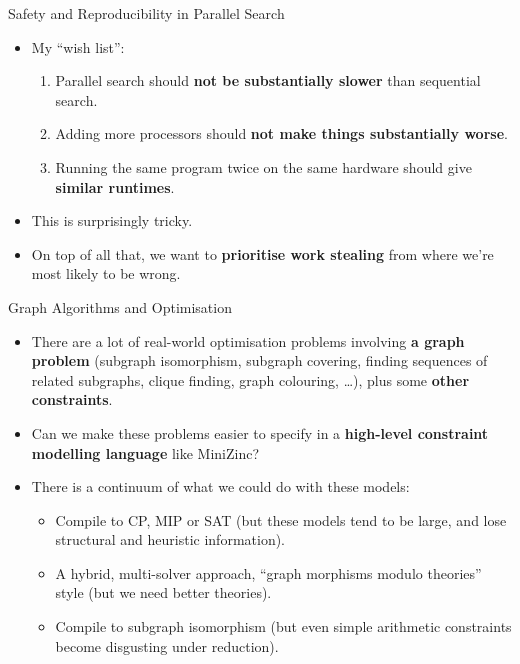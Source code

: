 \documentclass{beamer}
\begin{document}
\begin{frame}{Safety and Reproducibility in Parallel Search}

    \begin{itemize}
        \item My ``wish list'':
            \begin{enumerate}
                \item Parallel search should \textbf{not be substantially
                    slower} than sequential search.
                \item Adding more processors should \textbf{not make things
                    substantially worse}.
                \item Running the same program twice on the same hardware
                    should give \textbf{similar runtimes}.
            \end{enumerate}
        \item This is surprisingly tricky.
        \item On top of all that, we want to \textbf{prioritise work stealing}
            from where we're most likely to be wrong.
    \end{itemize}
\end{frame}

\begin{frame}{Graph Algorithms and Optimisation}

    \begin{itemize}
        \item There are a lot of real-world optimisation problems involving \textbf{a
            graph problem} (subgraph isomorphism, subgraph covering, finding
            sequences of related subgraphs, clique finding, graph colouring,
            \ldots), plus some \textbf{other constraints}.

        \item Can we make these problems easier to specify in a \textbf{high-level constraint
            modelling language} like MiniZinc?

        \item There is a continuum of what we could do with these models:

            \begin{itemize}

                \item Compile to CP, MIP or SAT (but these models tend to be large, and lose
                    structural and heuristic information).
                \item A hybrid, multi-solver approach, ``graph morphisms modulo theories'' style
                    (but we need better theories).
                \item Compile to subgraph isomorphism (but even simple arithmetic constraints become
                    disgusting under reduction).

            \end{itemize}
    \end{itemize}
\end{frame}
\end{document}
